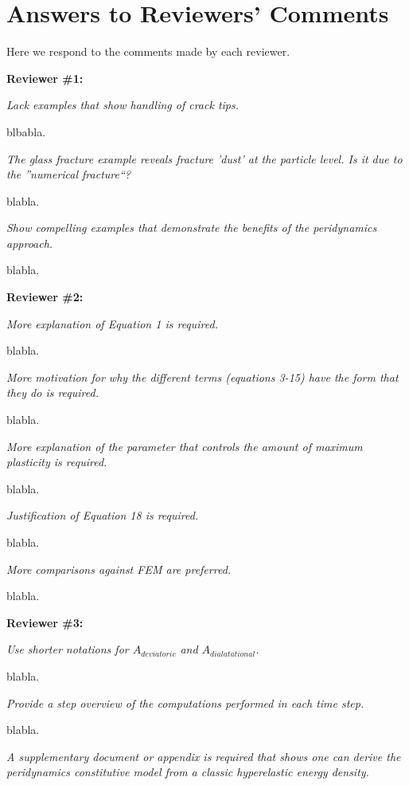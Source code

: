 \section{Answers to Reviewers' Comments}

Here we respond to the comments made by each reviewer.

\noindent{}\textbf{Reviewer \#1:}

\emph{Lack examples that show handling of crack tips.}

blbabla.

\emph{The glass fracture example reveals fracture 'dust' at the particle level. Is it due to the ''numerical fracture``?}

blabla.

\emph{Show compelling examples that demonstrate the benefits of the peridynamics approach.}

blabla.

\noindent{}\textbf{Reviewer \#2:}

\emph{More explanation of Equation 1 is required.}

blabla.

\emph{More motivation for why the different terms (equations 3-15) have the form that they do is required.}

blabla.

\emph{More explanation of the parameter that controls the amount of maximum plasticity is required.}

blabla.

\emph{Justification of Equation 18 is required.}

blabla.

\emph{More comparisons against FEM are preferred.}

blabla.

\noindent{}\textbf{Reviewer \#3:}

\emph{Use shorter notations for $A_{deviatoric}$ and $A_{dialatational}$.}

blabla.

\emph{Provide a step overview of the computations performed in each time step.}

blabla.

\emph{A supplementary document or appendix is required that shows one can derive the peridynamics constitutive model from a classic hyperelastic energy density.}

